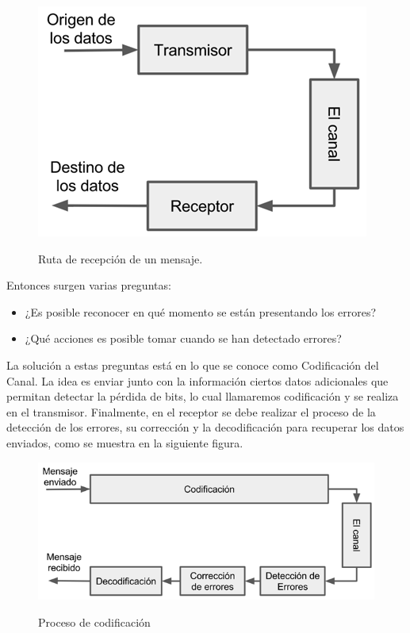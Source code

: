 \vspace{200px}
\begin{figure}[h!]
	\captionsetup{justification = raggedright, singlelinecheck = false}
	\caption{Ruta de recepción de un mensaje.} 
	\centering
	\includegraphics[scale=1]{Imagenes/Origen-datos.png}
	\label{fig:Origen-datos}
\end{figure}

Entonces surgen varias preguntas:
\begin{itemize}
    \item ¿Es posible reconocer en qué momento se están presentando los errores?
    \item ¿Qué acciones es posible tomar cuando se han detectado errores?
\end{itemize}
La solución a estas preguntas está en lo que se conoce como Codificación del Canal. La idea es enviar junto con la información ciertos datos adicionales que permitan detectar la pérdida de bits, lo cual llamaremos codificación y se realiza en el transmisor. Finalmente, en el receptor se debe realizar el proceso de la detección de los errores, su corrección y la decodificación para recuperar los datos enviados, como se muestra en la siguiente figura. \\

\begin{figure}[h!]
	\captionsetup{justification = raggedright, singlelinecheck = false}
	\caption{Proceso de codificación } 
	\centering
	\includegraphics[scale=1]{Imagenes/Proceso-deco.png}
	\label{fig:Proceso-deco}
\end{figure}


